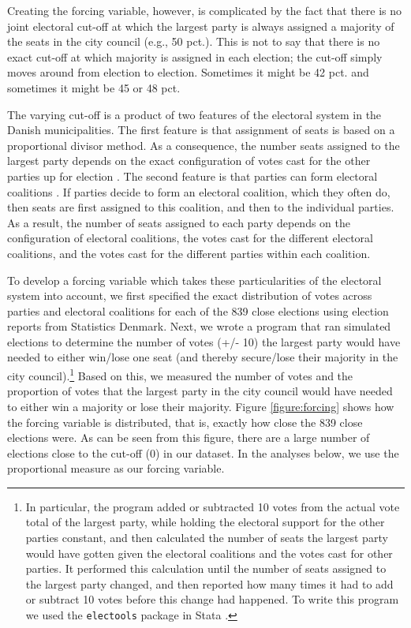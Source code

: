 \documentclass[a4paper,12pt]{article}
\begin{document}
Creating the forcing variable, however, is complicated by the fact that there is no joint electoral cut-off at which the largest party is always assigned a majority of the seats in the city council (e.g., 50 pct.). This is not to say that there is no exact cut-off at which majority is assigned in each election; the cut-off simply moves around from election to election. Sometimes it might be 42 pct. and sometimes it might be 45 or 48 pct. 

The varying cut-off is a product of two features of the electoral system in the Danish municipalities. The first feature is that assignment of seats is based on a proportional divisor method. As a consequence, the number seats assigned to the largest party depends on the exact configuration of votes cast for the other parties up for election \citep{fiva2016power,folke2014shades,freier2015parties}. The second feature is that parties can form electoral coalitions \citep{cox1997making}. If parties decide to form an electoral coalition, which they often do, then seats are first assigned to this coalition, and then to the individual parties. As a result, the number of seats assigned to each party depends on the configuration of electoral coalitions, the votes cast for the different electoral coalitions, and the votes cast for the different parties within each coalition.

To develop a forcing variable which takes these particularities of the electoral system into account, we first specified the exact distribution of votes across parties and electoral coalitions for each of the 839 close elections using election reports from Statistics Denmark. Next, we wrote a program that ran simulated elections to determine the number of votes (+/- 10) the largest party would have needed to either win/lose one seat (and thereby secure/lose their majority in the city council).\footnote{In particular, the program added or subtracted 10 votes from the actual vote total of the largest party, while holding the electoral support for the other parties constant, and then calculated the number of seats the largest party would have gotten given the electoral coalitions and the votes cast for other parties. It performed this calculation until the number of seats assigned to the largest party changed, and then reported how many times it had to add or subtract 10 votes before this change had happened. To write this program we used the \texttt{electools} package in Stata \citep{electools}.} Based on this, we measured the number of votes and the proportion of votes that the largest party in the city council would have needed to either win a majority or lose their majority. Figure \ref{figure:forcing} shows how the forcing variable is distributed, that is, exactly how close the 839 close elections were. As can be seen from this figure, there are a large number of elections close to the cut-off (0) in our dataset. In the analyses below, we use the proportional measure as our forcing variable. 
\end{document}
